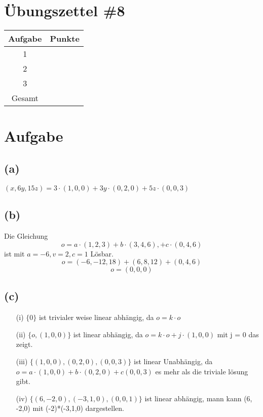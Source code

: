 \documentclass{article}
\begin{document}
\section*{Übungszettel \#8} %

\begin{center}
    \begin{tabular}{|c|c|}
        \hline
        Aufgabe & Punkte \\
        \hline
        1 & \\
        2 & \\
        3 & \\
        \hline
        Gesamt & \\
        \hline
    \end{tabular}
\end{center}

\section{Aufgabe}
\subsection*{(a)} \((x,6y,15z) = 3 \cdot (1,0,0) + 3y \cdot(0,2,0) + 5z \cdot(0,0,3) \)
\subsection*{(b)} Die Gleichung 
\[o = a \cdot (1,2,3) + b\cdot (3,4,6), +c\cdot(0,4,6)\]
ist mit \(a = -6, v = 2, c = 1\) Lösbar.
\[o = (-6,-12,18) + (6,8,12) + (0,4,6)\]
\[o = (0,0,0)\]
\subsection*{(c)}
\begin{itemize}
    \item [(i)] \(\{0\}\) ist trivialer weise linear abhängig, da \(o = k \cdot o\)
    \item [(ii)] \(\{o, (1,0,0)\}\) ist linear abhängig, da \(o = k \cdot o + j \cdot (1,0,0)\) mit j = 0 das zeigt.
    \item [(iii)] \(\{(1,0,0),(0,2,0), (0,0,3)\}\) ist linear Unabhängig, da \(o = a \cdot (1,0,0) + b \cdot (0,2,0) + c (0,0,3)\) es mehr als die triviale lösung gibt. 
    \item [(iv)] \(\{(6, -2,0), (-3,1,0), (0,0,1)\}\) ist linear abhängig, mann kann (6, -2,0) mit (-2)*(-3,1,0) dargestellen.
\end{itemize}
\end{document}

